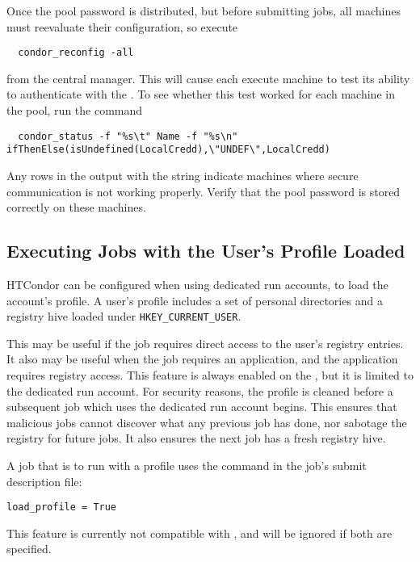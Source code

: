 Once the pool password is distributed, 
but before submitting jobs,
all machines must reevaluate their configuration,
so execute
\begin{verbatim}
  condor_reconfig -all
\end{verbatim}
from the central manager.
This will cause each execute machine to test its ability
to authenticate with the .
To see whether this test worked for each machine in the pool, run the command
\footnotesize
\begin{verbatim}
  condor_status -f "%s\t" Name -f "%s\n" ifThenElse(isUndefined(LocalCredd),\"UNDEF\",LocalCredd)
\end{verbatim}
\normalsize
Any rows in the output with the  string indicate machines where
secure communication is not working properly. Verify that the pool password
is stored correctly on these machines.

\subsection{\label{sec:windows-load-profile}Executing Jobs with the User's Profile Loaded}
HTCondor can be configured when using dedicated run accounts, 
to load the account's profile.  A user's profile includes a set of personal 
directories and a registry hive loaded under \texttt{HKEY\_CURRENT\_USER}.

This may be useful if the job requires direct access to the user's registry 
entries.
It also may be useful when the job requires an application, 
and the application requires registry access. 
This feature is always enabled on the , 
but it is limited to the dedicated run account.
For security reasons, the profile is cleaned before a subsequent
job which uses the dedicated run account begins.
This ensures 
that malicious jobs cannot discover what any previous job has done, nor 
sabotage the registry for future jobs. It also ensures the next job has 
a fresh registry hive.

A job that is to run with a profile uses the
 command in the job's submit description file:
\begin{verbatim}
load_profile = True
\end{verbatim}

This feature is currently not compatible with , 
and will be ignored if both are specified.

